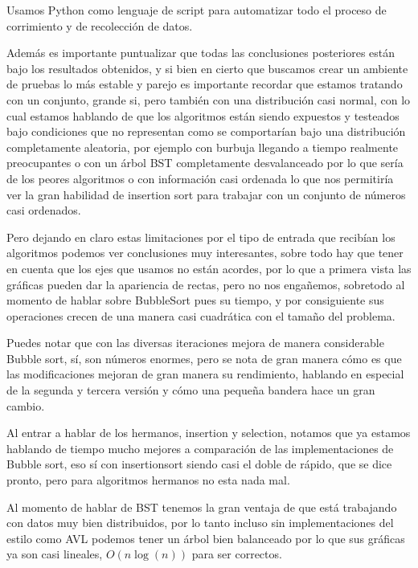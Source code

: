 \documentclass[12pt, fleqn]{report}                             %
\theoremstyle{break}                                            %
\begin{document}
    	    Usamos Python como lenguaje de script para automatizar todo el proceso de corrimiento y de recolección de datos.
    	    
    	    Además es importante puntualizar que todas las conclusiones posteriores están bajo los resultados obtenidos, y si bien en cierto que buscamos
    	    crear un ambiente de pruebas lo más estable y parejo es importante recordar que estamos tratando con un conjunto, grande si, pero también con
    	    una distribución casi normal, con lo cual estamos hablando de que los algoritmos están siendo expuestos y testeados bajo condiciones que no 
    	    representan como se comportarían bajo una distribución completamente aleatoria, por ejemplo con burbuja llegando a tiempo realmente preocupantes 
    	    o con un árbol BST completamente desvalanceado por lo que sería de los peores algoritmos o con información casi ordenada lo que nos permitiría
    	    ver la gran habilidad de insertion sort para trabajar con un conjunto de números casi ordenados.
    	    
    	    Pero dejando en claro estas limitaciones por el tipo de entrada que recibían los algoritmos podemos ver conclusiones muy interesantes, sobre todo hay que tener en cuenta que los ejes que usamos no están acordes, por lo que a primera vista las gráficas pueden dar la apariencia de rectas, pero no nos engañemos, sobretodo al momento de hablar sobre BubbleSort pues su tiempo, 
    	    y por consiguiente sus operaciones crecen de una manera casi cuadrática con el tamaño del problema.
    	    
    	    Puedes notar que con las diversas iteraciones mejora de manera considerable Bubble sort, sí, son números enormes, pero se nota de gran manera cómo es que las modificaciones mejoran de gran manera su rendimiento, hablando en especial de la segunda y tercera versión y cómo una pequeña bandera hace un gran cambio.
    	    
    	    Al entrar a hablar de los hermanos, insertion y selection, notamos que ya estamos hablando de tiempo mucho mejores a comparación de las implementaciones de Bubble sort, eso sí con insertionsort
    	    siendo casi el doble de rápido, que se dice pronto, pero para algoritmos hermanos no esta nada mal.
    	    
    	    Al momento de hablar de BST tenemos la gran ventaja de que está trabajando con datos muy bien distribuidos, por lo tanto
    	    incluso sin implementaciones del estilo como AVL podemos tener un árbol bien balanceado por lo que sus gráficas ya son casi lineales, $O(n\log(n))$ para ser correctos.
    	    
\end{document}
